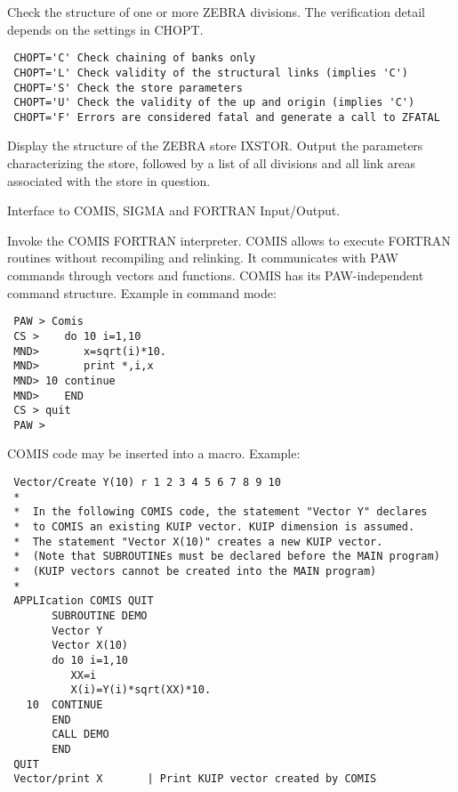\BEGARG
{}
\ENDARG
\BEGTEXT
Check the structure of one or more ZEBRA divisions.
The verification detail depends on the settings in CHOPT.
\begin{verbatim}
 CHOPT='C' Check chaining of banks only
 CHOPT='L' Check validity of the structural links (implies 'C')
 CHOPT='S' Check the store parameters
 CHOPT='U' Check the validity of the up and origin (implies 'C')
 CHOPT='F' Errors are considered fatal and generate a call to ZFATAL
\end{verbatim}
\ENDTEXT

\BEGARG
{}
\ENDARG
\BEGTEXT
Display the structure of the ZEBRA store IXSTOR.
Output the parameters characterizing the store, followed by a
list of all divisions and all link areas associated with the store in
question.
\ENDTEXT


\BEGTEXT
Interface to COMIS, SIGMA and FORTRAN Input/Output.
\ENDTEXT

\BEGTEXT
Invoke the COMIS FORTRAN interpreter.
COMIS allows to execute FORTRAN routines without recompiling
and relinking. It communicates
with PAW commands through vectors and functions. COMIS has its
PAW-independent command structure.
Example in command mode:
\begin{verbatim}
 PAW > Comis
 CS >    do 10 i=1,10
 MND>       x=sqrt(i)*10.
 MND>       print *,i,x
 MND> 10 continue
 MND>    END
 CS > quit
 PAW >
\end{verbatim}
COMIS code may be inserted into a macro. Example:
\begin{verbatim}
 Vector/Create Y(10) r 1 2 3 4 5 6 7 8 9 10
 *
 *  In the following COMIS code, the statement "Vector Y" declares
 *  to COMIS an existing KUIP vector. KUIP dimension is assumed.
 *  The statement "Vector X(10)" creates a new KUIP vector.
 *  (Note that SUBROUTINEs must be declared before the MAIN program)
 *  (KUIP vectors cannot be created into the MAIN program)
 *
 APPLIcation COMIS QUIT
       SUBROUTINE DEMO
       Vector Y
       Vector X(10)
       do 10 i=1,10
          XX=i
          X(i)=Y(i)*sqrt(XX)*10.
   10  CONTINUE
       END
       CALL DEMO
       END
 QUIT
 Vector/print X       | Print KUIP vector created by COMIS
\end{verbatim}
\ENDTEXT

